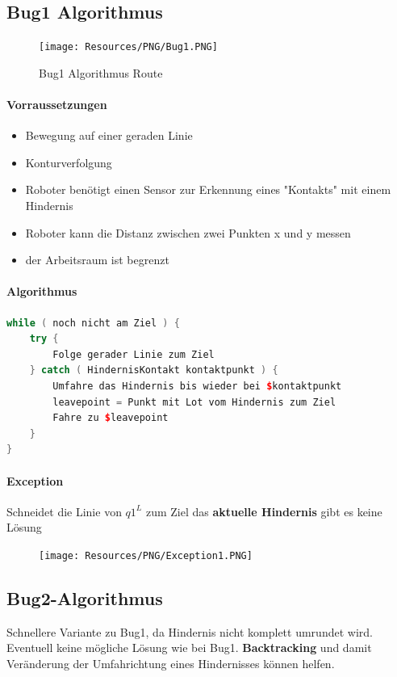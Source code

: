 \pagebreak
\subsection{Bug1 Algorithmus}
{
\begin{figure}
	\vspace{-1cm}
	\texttt{[image: Resources/PNG/Bug1.PNG]}
	\caption{Bug1 Algorithmus Route}
	\label{fig:PNG/Bug1.png}
\end{figure}
\paragraph{Vorraussetzungen}
\begin{itemize}
	\item Bewegung auf einer geraden Linie
	\item Konturverfolgung
	\item Roboter benötigt einen Sensor zur Erkennung eines "Kontakts" mit einem
		Hindernis
	\item Roboter kann die Distanz zwischen zwei Punkten x und y messen
	\item der Arbeitsraum ist begrenzt
\end{itemize}

}

\paragraph{Algorithmus}
\begin{lstlisting}[language=c++, caption={}]
while ( noch nicht am Ziel ) {
	try {
		Folge gerader Linie zum Ziel
	} catch ( HindernisKontakt kontaktpunkt ) {
		Umfahre das Hindernis bis wieder bei $kontaktpunkt
		leavepoint = Punkt mit Lot vom Hindernis zum Ziel
		Fahre zu $leavepoint
	}
}
\end{lstlisting}

\paragraph{Exception}
Schneidet die Linie von $q1^L$ zum Ziel das \textbf{aktuelle Hindernis} gibt
es keine Lösung
\begin{figure}[H]
	\begin{center}
		\texttt{[image: Resources/PNG/Exception1.PNG]}
		\caption{}
		\label{fig:PNG/Exception1.PNG}
	\end{center}
\end{figure}

\subsection{Bug2-Algorithmus}
Schnellere Variante zu Bug1, da Hindernis nicht komplett umrundet wird.
Eventuell keine mögliche Lösung wie bei Bug1. \textbf{Backtracking} und
damit Veränderung der Umfahrichtung eines Hindernisses können helfen.


